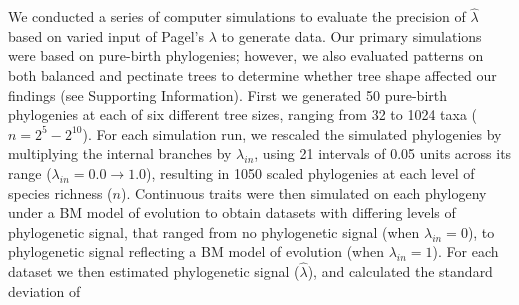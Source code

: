 \documentclass[
]{article}
\begin{document}
We conducted a series of computer simulations to evaluate the precision
of \(\hat{\lambda}\) based on varied input of Pagel's \(\lambda\) to
generate data. Our primary simulations were based on pure-birth
phylogenies; however, we also evaluated patterns on both balanced and
pectinate trees to determine whether tree shape affected our findings
(see Supporting Information). First we generated 50 pure-birth
phylogenies at each of six different tree sizes, ranging from 32 to 1024
taxa (\(n=2^5 - 2^{10}\)). For each simulation run, we rescaled the
simulated phylogenies by multiplying the internal branches by
\(\lambda_{in}\), using 21 intervals of 0.05 units across its range
(\(\lambda_{in} = 0.0 \to 1.0\)), resulting in 1050 scaled phylogenies
at each level of species richness (\(n\)). Continuous traits were then
simulated on each phylogeny under a BM model of evolution to obtain
datasets with differing levels of phylogenetic signal, that ranged from
no phylogenetic signal (when \(\lambda_{in} =0\)), to phylogenetic
signal reflecting a BM model of evolution (when \(\lambda_{in} =1\)).
For each dataset we then estimated phylogenetic signal
(\(\hat{\lambda}\)), and calculated the standard deviation of
\end{document}
